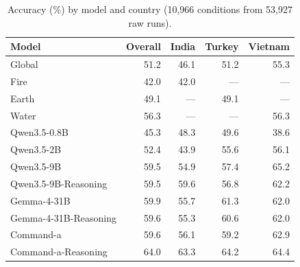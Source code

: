 \begin{table}[t]
\centering\footnotesize
\setlength{\tabcolsep}{5pt}
\begin{tabular}{lrrrr}
\toprule
Model & Overall & India & Turkey & Vietnam \\
\midrule
Global & 51.2 & 46.1 & 51.2 & 55.3 \\
Fire & 42.0 & 42.0 & --- & --- \\
Earth & 49.1 & --- & 49.1 & --- \\
Water & 56.3 & --- & --- & 56.3 \\
Qwen3.5-0.8B & 45.3 & 48.3 & 49.6 & 38.6 \\
Qwen3.5-2B & 52.4 & 43.9 & 55.6 & 56.1 \\
Qwen3.5-9B & 59.5 & 54.9 & 57.4 & 65.2 \\
Qwen3.5-9B-Reasoning & 59.5 & 59.6 & 56.8 & 62.2 \\
Gemma-4-31B & 59.9 & 55.7 & 61.3 & 62.0 \\
Gemma-4-31B-Reasoning & 59.6 & 55.3 & 60.6 & 62.0 \\
Command-a & 59.6 & 56.1 & 59.2 & 62.9 \\
Command-a-Reasoning & 64.0 & 63.3 & 64.2 & 64.4 \\
\bottomrule
\end{tabular}
\caption{Accuracy (\%) by model and country (10,966 conditions from 53,927 raw runs).}
\label{tab:accuracy-by-model}
\end{table}
